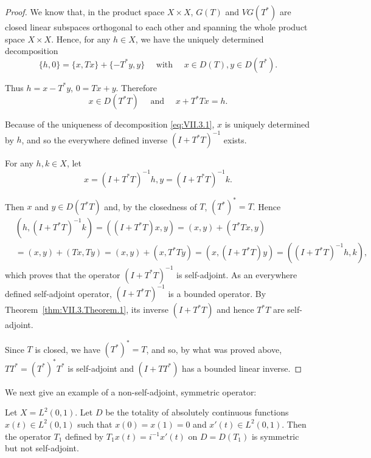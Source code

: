 \begin{proof}
 We know that, in the product space $X \times X$, $G(T)$ and $VG(T^{*})$ are closed linear subspaces orthogonal to each other and spanning the whole product space $X \times X$. Hence, for any $h \in X$, we have the uniquely determined decomposition 
\begin{equation}\label{eq:VII.3.1}
\{h, 0 \} = \{x, T x \} + \{- T ^{*} y, y \} \quad \text{ with } \quad x \in D (T), y \in D (T ^{*}). \end{equation}

Thus $h = x - T^{*}y$, $0 = Tx + y$. Therefore 
\begin{equation}\label{eq:VII.3.2}
x \in D (T ^{*} T) \quad \text{ and } \quad x + T ^{*} T x = h.
\end{equation}

Because of the uniqueness of decomposition \eqref{eq:VII.3.1}, $x$ is uniquely determined by $h$, and so the everywhere defined inverse $(I + T^{*}T)^{-1}$ exists. 

For any $h, k \in X$, let 
\[
x = (I + T ^{*} T) ^{-1} h, y = (I + T ^{*} T) ^{-1} k.
\]

Then $x$ and $y \in D(T^*T)$ and, by the closedness of $T$, $(T^*)^* = T$. Hence 
\[
\begin{aligned}
&(h, (I + T ^{*} T) ^{-1} k)  = ((I + T ^{*} T) x, y) = (x, y) + (T ^{*} T x, y) \\
&= (x, y) + (T x, T y) = (x, y) + (x, T ^{*} T y) = (x, (I + T ^{*} T) y) = ((I + T ^{*} T) ^{-1} h, k),
\end{aligned}
\]
which proves that the operator $(I + T^{*}T)^{-1}$ is self-adjoint. As an everywhere defined self-adjoint operator, $(I + T^{*}T)^{-1}$ is a bounded operator. By Theorem~\ref{thm:VII.3.Theorem.1}, its inverse $(I + T^{*}T)$ and hence $T^{*}T$ are self-adjoint. 

Since $T$ is closed, we have $(T^{*})^{*} = T$, and so, by what was proved above, $TT^{*} = (T^{*})^{*}T^{*}$ is self-adjoint and $(I + TT^{*})$ has a bounded linear inverse. 
\end{proof}

We next give an example of a non-self-adjoint, symmetric operator: 

\begin{example}\label{ex:VII.3.Example.4} Let $X = L^2(0,1)$. Let $D$ be the totality of absolutely continuous functions $x(t) \in L^2(0,1)$ such that $x(0) = x(1) = 0$ and $x'(t) \in L^2(0,1)$. Then the operator $T_1$ defined by $T_1x(t) = i^{-1}x'(t)$ on $D = D(T_1)$ is symmetric but not self-adjoint. 
\end{example}

